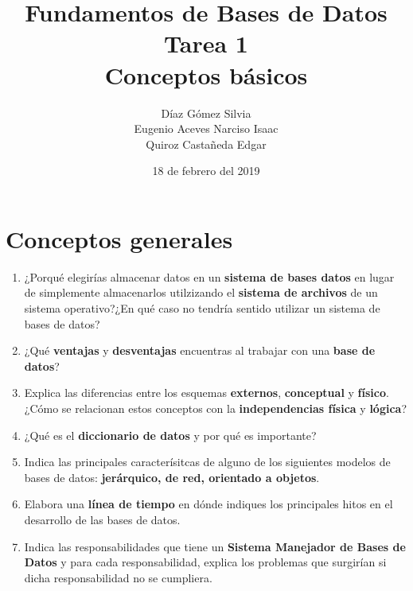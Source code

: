 \documentclass{article}
\begin{document}
    \title{Fundamentos de Bases de Datos \\
        Tarea 1 \\
        Conceptos básicos} 
    \author{Díaz Gómez Silvia \\
    Eugenio Aceves Narciso Isaac \\
    Quiroz Castañeda Edgar}
    \date{18 de febrero del 2019}
    \maketitle

    \section{Conceptos generales}

    \begin{enumerate}[label=\alph*.]
        \item {
            ¿Porqué elegirías almacenar datos en un \textbf{sistema de bases 
            datos} en lugar de simplemente almacenarlos utilzizando el 
            \textbf{sistema de archivos} de un sistema operativo?¿En qué caso no
            tendría sentido utilizar un sistema de bases de datos?
        }
        \item {
            ¿Qué \textbf{ventajas}  y \textbf{desventajas} encuentras al 
            trabajar con una \textbf{base de datos}?
        }
        \item {
            Explica las diferencias entre los esquemas \textbf{externos}, 
            \textbf{conceptual} y \textbf{físico}. ¿Cómo se relacionan estos 
            conceptos con la \textbf{independencias física} y \textbf{lógica}? 
        }
        \item {
            ¿Qué es el \textbf{diccionario de datos} y por qué es importante?
        }
        \item {
            Indica las principales caracterísitcas de alguno de los siguientes 
            modelos de bases de datos: \textbf{jerárquico, de red, orientado 
            a objetos}.
        }
        \item {
            Elabora una \textbf{línea de tiempo} en dónde indiques los principales
            hitos en el desarrollo de las bases de datos.
            }
        \item {
            Indica las responsabilidades que tiene un \textbf{Sistema Manejador
            de Bases de Datos} y para cada responsabilidad, explica los problemas
            que surgirían si dicha responsabilidad no se cumpliera.
}
\end{enumerate}
\end{document}
